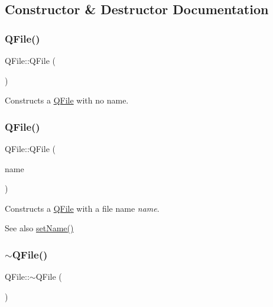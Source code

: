 \subsection{Constructor \& Destructor Documentation}
\mbox{\label{class_q_file_a4594575fa1a7d3ff40250fb52362cdf9}} 
\subsubsection{\texorpdfstring{QFile()}{QFile()}\hspace{0.1cm}{\footnotesize\ttfamily [1/2]}}
{\footnotesize\ttfamily Q\+File\+::\+Q\+File (\begin{DoxyParamCaption}{ }\end{DoxyParamCaption})}

Constructs a \mbox{\hyperlink{class_q_file}{Q\+File}} with no name. \mbox{\label{class_q_file_a2f6f03b893a6accdf03672698154c0ac}} 
\subsubsection{\texorpdfstring{QFile()}{QFile()}\hspace{0.1cm}{\footnotesize\ttfamily [2/2]}}
{\footnotesize\ttfamily Q\+File\+::\+Q\+File (\begin{DoxyParamCaption}\item[{const \mbox{\hyperlink{class_q_string}{Q\+String}} \&}]{name }\end{DoxyParamCaption})}

Constructs a \mbox{\hyperlink{class_q_file}{Q\+File}} with a file name {\itshape name}. \begin{DoxySeeAlso}{See also}
\mbox{\hyperlink{class_q_file_aedc2f51f8c46021cfb4ae82bae0e3b2d}{set\+Name()}} 
\end{DoxySeeAlso}
\mbox{\label{class_q_file_acc10a60e8d9d8b873a43ab9be0b5c137}} 
\subsubsection{\texorpdfstring{$\sim$QFile()}{~QFile()}}
{\footnotesize\ttfamily Q\+File\+::$\sim$\+Q\+File (\begin{DoxyParamCaption}{ }\end{DoxyParamCaption})\hspace{0.3cm}{\ttfamily [virtual]}}

